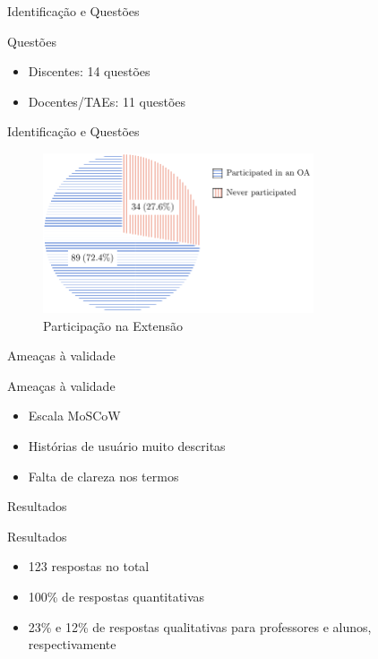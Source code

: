 \begin{frame}{{\sffamily Identificação e Questões}}
  \begin{block}{Questões}
    \begin{itemize}
      \item Discentes: 14 questões
      \item Docentes/TAEs: 11 questões
    \end{itemize}
  \end{block}
\end{frame}

\begin{frame}{{\sffamily Identificação e Questões}}
  \begin{figure}
    \centering
    \caption{Participação na Extensão}
    \includegraphics[width=8cm, ]{img/5-outreach-participation.pdf}
  \end{figure}
\end{frame}

\begin{frame}{{\sffamily Ameaças à validade}}
  \begin{block}{Ameaças à validade}
    \begin{itemize}
      \item Escala MoSCoW
      \item Histórias de usuário muito descritas
      \item Falta de clareza nos termos
    \end{itemize}
  \end{block}
\end{frame}

\begin{frame}{{\sffamily Resultados}}
  \begin{block}{Resultados}
    \begin{itemize}
      \item 123 respostas no total
      \item 100\% de respostas quantitativas
      \item 23\% e 12\% de respostas qualitativas para professores e alunos, respectivamente
    \end{itemize}
  \end{block}
\end{frame}

